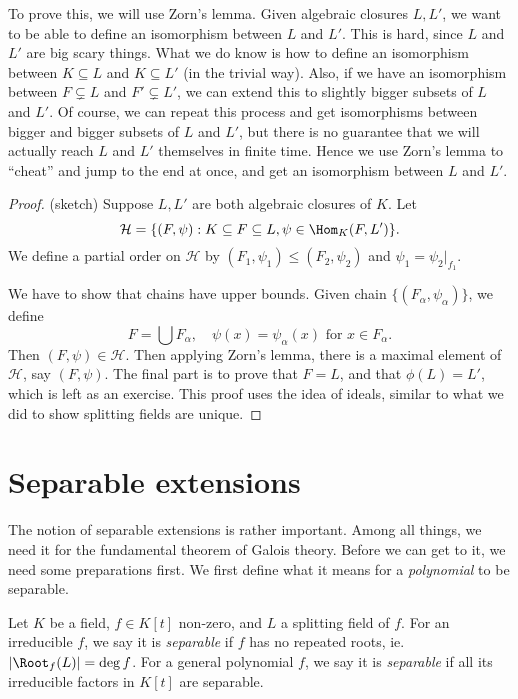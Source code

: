 \documentclass[a4paper]{article}
\begin{document}
To prove this, we will use Zorn's lemma. Given algebraic closures $L, L'$, we want to be able to define an isomorphism between $L$ and $L'$. This is hard, since $L$ and $L'$ are big scary things. What we do know is how to define an isomorphism between $K\subseteq L$ and $K\subseteq L'$ (in the trivial way). Also, if we have an isomorphism between $F\subsetneq L$ and $F'\subsetneq L'$, we can extend this to slightly bigger subsets of $L$ and $L'$. Of course, we can repeat this process and get isomorphisms between bigger and bigger subsets of $L$ and $L'$, but there is no guarantee that we will actually reach $L$ and $L'$ themselves in finite time. Hence we use Zorn's lemma to ``cheat'' and jump to the end at once, and get an isomorphism between $L$ and $L'$.

\begin{proof}(sketch)
  Suppose $L, L'$ are both algebraic closures of $K$. Let
  \[
    \mathcal{H} = \{(F, \psi): K\subseteq F\subseteq L, \psi \in \Hom_K(F, L')\}.
  \]
  We define a partial order on $\mathcal{H}$ by $(F_1, \psi_1) \leq (F_2, \psi_2)$ and $\psi_1= \psi_2|_{f_1}$.

  We have to show that chains have upper bounds. Given chain $\{(F_\alpha, \psi_\alpha)\}$, we define
  \[
    F = \bigcup F_\alpha,\quad \psi(x) = \psi_\alpha(x)\text{ for }x \in F_\alpha.
  \]
  Then $(F, \psi) \in \mathcal{H}$. Then applying Zorn's lemma, there is a maximal element of $\mathcal{H}$, say $(F, \psi)$. The final part is to prove that $F = L$, and that $\phi(L) = L'$, which is left as an exercise. This proof uses the idea of ideals, similar to what we did to show splitting fields are unique.
\end{proof}

\section{Separable extensions}
The notion of separable extensions is rather important. Among all things, we need it for the fundamental theorem of Galois theory. Before we can get to it, we need some preparations first. We first define what it means for a \emph{polynomial} to be separable.

\begin{defi}
  Let $K$ be a field, $f\in K[t]$ non-zero, and $L$ a splitting field of $f$. For an irreducible $f$, we say it is \emph{separable} if $f$ has no repeated roots, ie. $|\Root_f(L)| = \deg f$. For a general polynomial $f$, we say it is \emph{separable} if all its irreducible factors in $K[t]$ are separable.
\end{defi}
\end{document}
